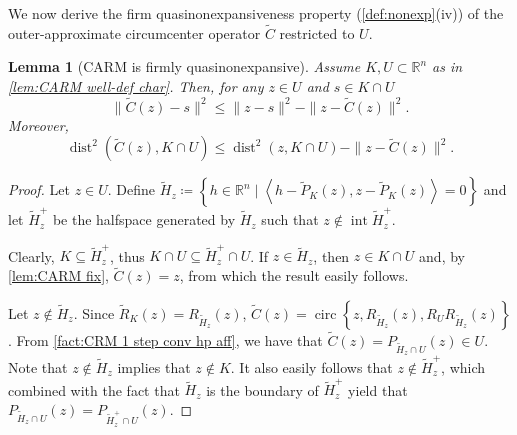 \documentclass[smallextended,numbook,nospthms]{svjour3}
\theoremstyle{plain}
\newtheorem{lemma}[theorem]{Lemma}
\theoremstyle{definition}
\def\RR{\mathds R}
\DeclareMathOperator{\dist}{dist}
\DeclareMathOperator{\inte}{int}
\newcommand{\scal}[2]{\left\langle{#1},{#2}  \right\rangle}
\DeclareMathOperator{\circum}{circ}
\begin{document}
We now derive the firm quasinonexpansiveness property (\cref{def:nonexp}(iv)) of the outer-approximate circumcenter operator $\tilde{C}$ restricted to $U$.
\begin{lemma}[CARM is firmly quasinonexpansive] \label{lem:CARM quasinonexp}
	Assume $K, U \subset \RR^{n}$ as in  \cref{lem:CARM well-def char}. Then, for any $z \in U$ and $s \in K \cap U$
	\begin{equation}\label{eq: CARM fqne}
		\|\tilde{C}(z)-s\|^{2} \leq \|z-s\|^{2}-\|z-\tilde{C}(z)\|^{2}.
		\end{equation}
	Moreover,
	\begin{equation}
		\dist^{2}(\tilde{C}(z), K \cap U) \leq \dist^{2}(z, K \cap U)-\|z-\tilde{C}(z)\|^{2}.
	\end{equation}
\end{lemma}
	\begin{proof}
	
	
	Let $z \in U$. Define $\tilde{H}_{z} \coloneqq \left\{h \in \RR^{n} \mid \scal{h-\tilde{P}_{K}(z)}{z-\tilde{P}_{K}(z)}=0\right\}$ %
	and let $\tilde{H}_{z}^{+}$ be the halfspace generated by $\tilde{H}_{z}$ such that $z \notin \inte\tilde{H}^{+}_{z}$.
	
	Clearly, $K \subseteq \tilde{H}_{z}^{+}$, thus $K \cap U \subseteq \tilde{H}_{z}^{+} \cap U$. If $z \in \tilde{H}_{z}$, then $z \in K \cap U$ and, by  \cref{lem:CARM fix}, $\tilde{C}(z)=z$, from which the result easily follows.
	
	Let $z \notin \tilde{H}_{z}$. Since $\tilde{R}_{K}(z)=R_{\tilde{H}_{z}}(z)$,  $\tilde{C}(z)=\circum\left\{z, R_{\tilde{H}_{z}}(z), R_{U}R_{\tilde{H}_{z}}(z)\right\}$. From  \cref{fact:CRM 1 step conv hp aff}, we have that $\tilde{C}(z)=P_{\tilde{H}_{z}\cap U}(z) \in U$. Note that $z \not\in \tilde{H}_{z}$ implies that $z \not\in K$. It also easily follows that $z \notin \tilde{H}_{z}^{+}$, which combined with the fact that $\tilde{H}_{z}$ is the boundary of $\tilde{H}_{z}^{+}$ yield that $P_{\tilde{H}_{z} \cap U}(z)=P_{\tilde{H}_{z}^{+} \cap U}(z)$.
	

\end{proof}
\end{document}
